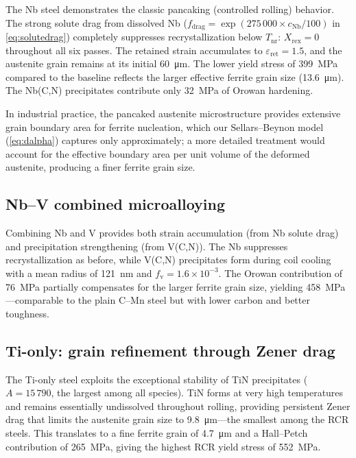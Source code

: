 \documentclass[11pt,a4paper]{article}
\newcommand{\Xrex}{\ensuremath{X_\mathrm{rex}}}
\newcommand{\epsr}{\ensuremath{\varepsilon_\mathrm{ret}}}
\newcommand{\fv}{\ensuremath{f_\mathrm{v}}}
\begin{document}
The Nb steel demonstrates the classic pancaking (controlled rolling) behavior.
The strong solute drag from dissolved Nb
($f_\mathrm{drag} = \exp(275\,000 \times c_\mathrm{Nb}/100)$ in \cref{eq:solutedrag})
completely suppresses recrystallization below
$T_\mathrm{nr}$: $\Xrex = 0$ throughout all six passes.  The retained strain
accumulates to $\epsr = 1.5$, and the austenite grain remains at its initial
\SI{60}{\micro\metre}.  The lower yield
stress of \SI{399}{\mega\pascal} compared to the baseline reflects the larger
effective ferrite grain size (\SI{13.6}{\micro\metre}).  The Nb(C,N) precipitates
contribute only \SI{32}{\mega\pascal} of Orowan hardening.

In industrial practice, the pancaked austenite microstructure provides extensive
grain boundary area for ferrite nucleation, which our Sellars--Beynon model
(\cref{eq:dalpha}) captures only approximately; a more detailed treatment
would account for the effective boundary area per unit volume of the
deformed austenite, producing a finer ferrite grain size.

\subsection{Nb--V combined microalloying}

Combining Nb and V provides both strain accumulation (from Nb solute drag) and
precipitation strengthening (from V(C,N)).  The Nb suppresses recrystallization
as before, while V(C,N) precipitates form during coil cooling with a mean radius
of \SI{121}{\nano\metre} and $\fv = 1.6 \times 10^{-3}$.  The Orowan contribution of
\SI{76}{\mega\pascal} partially compensates for the larger ferrite grain size,
yielding \SI{458}{\mega\pascal}---comparable to the plain C--Mn steel but with
lower carbon and better toughness.

\subsection{Ti-only: grain refinement through Zener drag}

The Ti-only steel exploits the exceptional stability of TiN precipitates
($A = 15\,790$, the largest among all species).  TiN forms at very high
temperatures and remains essentially undissolved throughout rolling, providing
persistent Zener drag that limits the austenite grain size to
\SI{9.8}{\micro\metre}---the smallest among the RCR steels.  This translates
to a fine ferrite grain of \SI{4.7}{\micro\metre} and a Hall--Petch contribution
of \SI{265}{\mega\pascal}, giving the highest RCR yield stress of
\SI{552}{\mega\pascal}.
\end{document}
